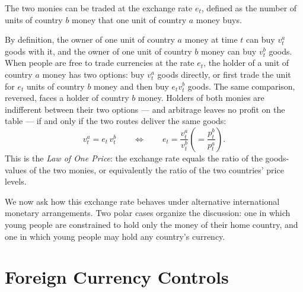 The two monies can be traded at the exchange rate $e_t$, defined as the number of units of country $b$ money that one unit of country $a$ money buys.


By definition, the owner of one unit of country $a$ money at time $t$ can buy $v_t^a$ goods with it, and the owner of one unit of country $b$ money can buy $v_t^b$ goods. When people are free to trade currencies at the rate $e_t$, the holder of a unit of country $a$ money has two options: buy $v_t^a$ goods directly, or first trade the unit for $e_t$ units of country $b$ money and then buy $e_t v_t^b$ goods. The same comparison, reversed, faces a holder of country $b$ money. Holders of both monies are indifferent between their two options --- and arbitrage leaves no profit on the table --- if and only if the two routes deliver the same goods:
\[
v_t^a = e_t\, v_t^b
\qquad\Longleftrightarrow\qquad
e_t = \frac{v_t^a}{v_t^b} \left(= \frac{p_t^b}{p_t^a}\right).
\]
This is the \emph{Law of One Price}: the exchange rate equals the ratio of the goods-values of the two monies, or equivalently the ratio of the two countries' price levels.


We now ask how this exchange rate behaves under alternative international monetary arrangements. Two polar cases organize the discussion: one in which young people are constrained to hold only the money of their home country, and one in which young people may hold any country's currency.

\section{Foreign Currency Controls}

